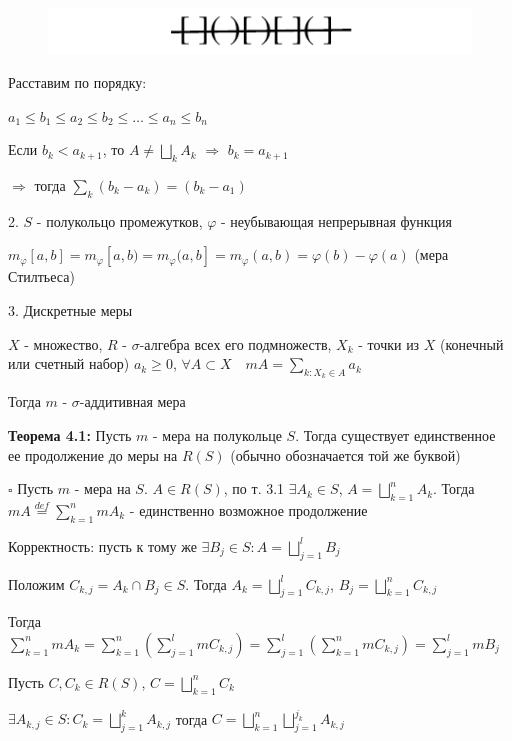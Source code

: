 \documentclass[a4paper]{report}
\begin{document}
\begin{figure} 
\includegraphics[width=\linewidth]{4}
\end{figure}
 
Расставим по порядку:

\noindent
$a_1\le b_1\le a_2\le b_2\le\ldots\le a_n\le b_n$

Если $b_k<a_{k+1}$, то $A\ne\bigsqcup\limits_k A_k$ $\Rightarrow$ $b_k=a_{k+1}$ 

$\Rightarrow$ тогда $\sum\limits_k
(b_k-a_k)=(b_k-a_1)$

2. $S$ - полукольцо промежутков, $\varphi$ - неубывающая непрерывная функция

$m_\varphi[a,b]=m_\varphi[a,b)=m_\varphi(a,b]=m_\varphi(a,b)=\varphi(b)-\varphi(a)$ (мера Стилтьеса)
\bigskip

3. Дискретные меры

$X$ - множество, $R$ - $\sigma$-алгебра всех его подмножеств, $X_k$ - точки из $X$ (конечный или счетный набор) 
$a_k\ge0$, $\forall A\subset X\quad mA=\sum\limits_{k\colon X_k\in A}a_k$

Тогда $m$ - $\sigma$-аддитивная мера
\bigskip

\noindent\textbf{Теорема 4.1:} Пусть $m$ - мера на полукольце $S$. Тогда существует единственное ее продолжение до меры на 
$R(S)$ (обычно обозначается той же буквой)

\noindent $\square$ Пусть $m$ - мера на $S$. $A\in R(S)$, по т. 3.1 $\exists A_k\in S$, $A=\bigsqcup_{k=1}^n A_k$. 
Тогда $mA\stackrel{def}{=}\sum\limits_{k=1}^n mA_k$ - единственно возможное продолжение 

Корректность: пусть к тому же $\exists B_j\in S\colon A=\bigsqcup\limits_{j=1}^l B_j$

Положим $C_{k,j}=A_k\cap B_j\in S$. Тогда $A_k=\bigsqcup\limits_{j=1}^l C_{k,j}$, $B_j=\bigsqcup\limits_{k=1}^n C_{k,j}$

Тогда $\sum\limits_{k=1}^n mA_k=\sum\limits_{k=1}^n\left(\sum\limits_{j=1}^l mC_{k,j}\right)=\sum\limits_{j=1}^l
\left(\sum\limits_{k=1}^n mC_{k,j}\right)=\sum\limits_{j=1}^l mB_j$

Пусть $C,C_k\in R(S)$, $C=\bigsqcup\limits_{k=1}^n C_k$

$\exists A_{k,j}\in S\colon C_k=\bigsqcup\limits_{j=1}^k A_{k,j}$ тогда $C=\bigsqcup\limits_{k=1}^n\bigsqcup\limits_{j=1}^{j_k}
A_{k,j}$
\end{document}
